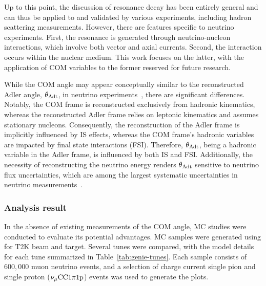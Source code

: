 Up to this point, the discussion of resonance decay has been entirely general and can thus be applied to and validated by various experiments, including hadron scattering measurements. 
However, there are features specific to neutrino experiments. 
First, the resonance is generated through neutrino-nucleon interactions, which involve both vector and axial currents. 
Second, the interaction occurs within the nuclear medium. 
This work focuses on the latter, with the application of COM variables to the former reserved for future research.

While the COM angle may appear conceptually similar to the reconstructed Adler angle, $\theta_{\textrm{Adt}}$, in neutrino experiments~\cite{Sanchez:2015yvw}, there are significant differences. 
Notably, the COM frame is reconstructed exclusively from hadronic kinematics, whereas the reconstructed Adler frame relies on leptonic kinematics and assumes stationary nucleons. 
Consequently, the reconstruction of the Adler frame is implicitly influenced by IS effects, whereas the COM frame's hadronic variables are impacted by final state interactions (FSI). 
Therefore, $\theta_{\textrm{Adt}}$, being a hadronic variable in the Adler frame, is influenced by both IS and FSI. 
Additionally, the necessity of reconstructing the neutrino energy renders $\theta_{\textrm{Adt}}$ sensitive to neutrino flux uncertainties, which are among the largest systematic uncertainties in neutrino measurements~\cite{T2K:2019yqu,T2K:2021naz,MicroBooNECollaboration:2024gvg,NOvA:2023uxq,MINERvA:2022djk}.


          \subsubsection{Analysis result}
          \label{sec:com-ana}
          In the absence of existing measurements of the COM angle, MC studies were conducted to evaluate its potential advantages.
          MC samples were generated using \genie \cite{Andreopoulos:2009rq, GENIE:2021npt} for T2K beam and target. 
          Several \genie tunes were compared, with the model details for each tune summarized in Table~\ref{tab:genie-tunes}. 
          Each sample consists of $600,000$ muon neutrino events, and a selection of charge current single pion and single proton ($\nu_{\mu}\textrm{CC}1\pi1\textrm{p}$) events was used to generate the plots.

